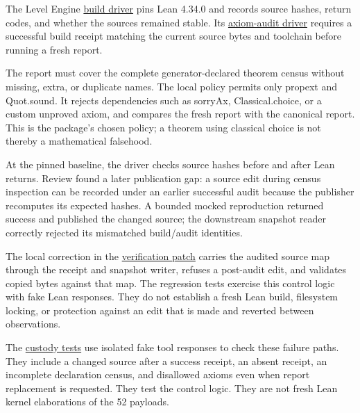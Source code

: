 \documentclass[
  11pt,
]{article}
\begin{document}
The Level Engine
\href{https://github.com/dbccpage/the_symbol_game/blob/52cb5457f6c485ba548cfd292f6012a941ed22cf/operations/use_cases/level_engine/lean_build.py}{build
driver} pins Lean 4.34.0 and records source hashes, return codes, and
whether the sources remained stable. Its
\href{https://github.com/dbccpage/the_symbol_game/blob/52cb5457f6c485ba548cfd292f6012a941ed22cf/operations/use_cases/level_engine/lean_audit.py}{axiom-audit
driver} requires a successful build receipt matching the current source
bytes and toolchain before running a fresh report.

The report must cover the complete generator-declared theorem census
without missing, extra, or duplicate names. The local policy permits
only propext and Quot.sound. It rejects dependencies such as sorryAx,
Classical.choice, or a custom unproved axiom, and compares the fresh
report with the canonical report. This is the package's chosen policy; a
theorem using classical choice is not thereby a mathematical falsehood.

At the pinned baseline, the driver checks source hashes before and after
Lean returns. Review found a later publication gap: a source edit during
census inspection can be recorded under an earlier successful audit
because the publisher recomputes its expected hashes. A bounded mocked
reproduction returned success and published the changed source; the
downstream snapshot reader correctly rejected its mismatched build/audit
identities.

The local correction in the
\href{https://github.com/dbccpage/the_symbol_game/blob/23893fc44162555fa12ceda3e1665982e3d7a14e/atlas/coda_atlas/symbol_game/verification/source_delta.patch}{verification
patch} carries the audited source map through the receipt and snapshot
writer, refuses a post-audit edit, and validates copied bytes against
that map. The regression tests exercise this control logic with fake
Lean responses. They do not establish a fresh Lean build, filesystem
locking, or protection against an edit that is made and reverted between
observations.

The
\href{https://github.com/dbccpage/the_symbol_game/blob/52cb5457f6c485ba548cfd292f6012a941ed22cf/operations/tests/level_engine/test_lean.py}{custody
tests} use isolated fake tool responses to check these failure paths.
They include a changed source after a success receipt, an absent
receipt, an incomplete declaration census, and disallowed axioms even
when report replacement is requested. They test the control logic. They
are not fresh Lean kernel elaborations of the 52 payloads.
\end{document}
